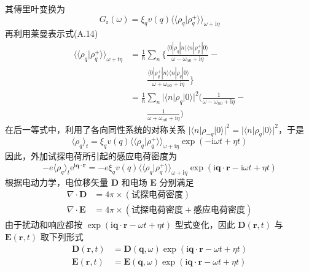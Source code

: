 其傅里叶变换为
\begin{equation}
G_{\mathrm{r}}(\omega)=\xi_{q}v(q)
\langle\langle\rho_{q}|\rho_{q}^{+}\rangle\rangle_{\omega+\mathrm{i}\eta}
\end{equation}
再利用莱曼表示式(A.14)
\begin{equation}
\begin{aligned}
\langle\langle\rho_{q}|\rho_{q}^{+}\rangle\rangle_{\omega+\mathrm{i}\eta}
&=\frac{1}{\hbar}\sum_{n}\biggl\{
\frac{\langle0|\rho_{q}|n\rangle\langle n|\rho_{q}^{+}|0\rangle}
{\omega-\omega_{n0}+\mathrm{i}\eta}-\\
&\qquad\frac{\langle0|\rho_{q}^{+}|n\rangle\langle n|\rho_{q}|0\rangle}
{\omega+\omega_{n0}+\mathrm{i}\eta}\biggr\}\\
&=\frac{1}{\hbar}\sum_{n}|\langle n|\rho_{q}|0\rangle|^{2}
\biggl(\frac{1}{\omega-\omega_{n0}+\mathrm{i}\eta}-\\
&\qquad\frac{1}{\omega+\omega_{n0}+\mathrm{i}\eta}\biggr)
\end{aligned}
\end{equation}
在后一等式中，利用了各向同性系统的对称关系
$|\langle n|\rho_{-q}|0\rangle|^{2}=|\langle n|\rho_{q}|0\rangle|^{2}$，于是
\begin{equation*}
\langle\rho_{q}\rangle_{t}=\xi_{q}v(q)
\langle\langle\rho_{q}|\rho_{q}^{+}\rangle\rangle_{\omega+\mathrm{i}\eta}
\exp(-\mathrm{i}\omega t+\eta t)
\end{equation*}
因此，外加试探电荷所引起的感应电荷密度为
\begin{equation}
-e\langle\rho_{q}\rangle_{t}\mathrm{e}^{\mathrm{i}\boldsymbol{q}
\cdot\boldsymbol{r}}=-e\xi_{q}v(q)
\langle\langle\rho_{q}|\rho_{q}^{+}\rangle\rangle_{\omega+\mathrm{i}\eta}
\exp(\mathrm{i}\boldsymbol{q}\cdot\boldsymbol{r}
-\mathrm{i}\omega t+\eta t)
\end{equation}
根据电动力学，电位移矢量 $\boldsymbol{D}$ 和电场 $\boldsymbol{E}$ 分别满足
\begin{align}
\nabla\cdot\boldsymbol{D}&=4\pi\times(\text{试探电荷密度})\nonumber\\
\nabla\cdot\boldsymbol{E}&=4\pi\times(\text{试探电荷密度}
+\text{感应电荷密度})
\end{align}
由于扰动和响应都按 $\exp(\mathrm{i}\boldsymbol{q}\cdot\boldsymbol{r}-\omega t+\eta t)$ 型式变化，因此 $\boldsymbol{D}(\boldsymbol{r},t)$ 与 $\boldsymbol{E}(\boldsymbol{r},t)$ 取下列形式
\begin{equation}
\begin{aligned}
\boldsymbol{D}(\boldsymbol{r},t)&=\boldsymbol{D}(\boldsymbol{q},\omega)
\exp(\mathrm{i}\boldsymbol{q}\cdot\boldsymbol{r}-\omega t+\eta t)\\
\boldsymbol{E}(\boldsymbol{r},t)&=\boldsymbol{E}(\boldsymbol{q},\omega)
\exp(\mathrm{i}\boldsymbol{q}\cdot\boldsymbol{r}-\omega t+\eta t)
\end{aligned}
\end{equation}
